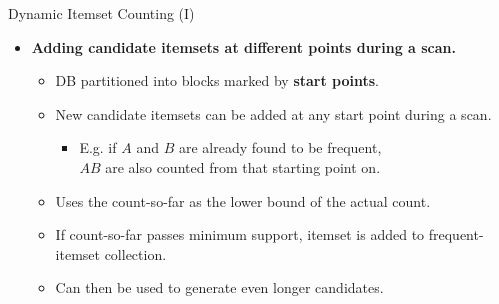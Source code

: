 \begin{frame}{Dynamic Itemset Counting (I)}
	\begin{itemize}
		\item \textbf{Adding candidate itemsets at different points during a
			      scan.}
		      \begin{itemize}
			      \item DB partitioned into blocks marked by
			            \textbf{\color{airforceblue}start points}.
			      \item New candidate itemsets can be added at any start point during
			            a scan.
			            \begin{itemize}
				            \item E.g. if $A$ and $B$ are already found to be frequent, \\
				                  $AB$ are also counted from that starting point on.
			            \end{itemize}
			      \item Uses the count-so-far as the lower bound of the actual count.
			      \item If count-so-far passes minimum support, itemset is added to
			            frequent-itemset collection.
			      \item Can then be used to generate even longer candidates.
		      \end{itemize}
	\end{itemize}
\end{frame}

